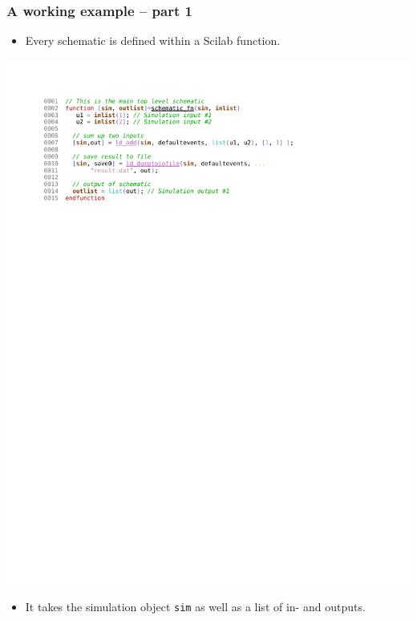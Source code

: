 \documentclass[serif,9pt,xcolor=dvipsnames]{beamer}
\begin{document}
\begin{frame}[fragile]
  \frametitle{A working example -- part 1}

\begin{itemize}
 \item Every schematic is defined within a Scilab function.
\end{itemize}

\centering \includegraphics[trim=3cm 20cm 4cm 1.4cm, clip, width=0.85\linewidth]{figures/schematic_fn.pdf} 

%    
%   
%   


\begin{itemize}
 \item It takes the simulation object \texttt{sim} as well as a list of in- and  outputs.
\end{itemize}


\end{frame}
\end{document}
